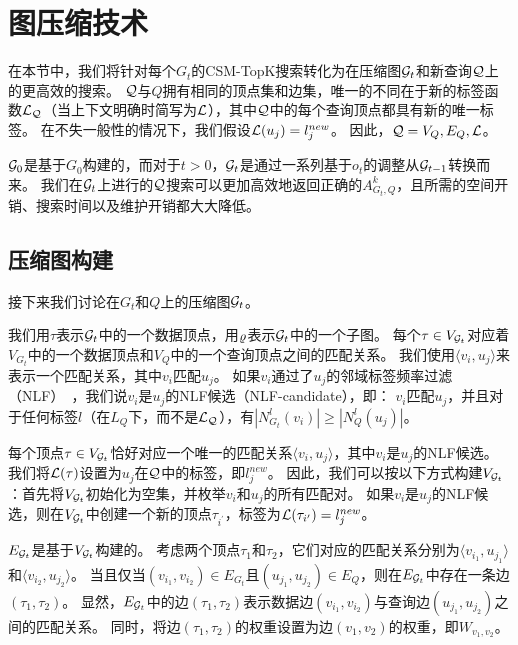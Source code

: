 \section{图压缩技术}
\label{mwstar:compact-graph}

在本节中，我们将针对每个$G_t$的CSM-TopK搜索转化为在压缩图$\mathcal{G}_t$和新查询$\mathcal{Q}$上的更高效的搜索。
$\mathcal{Q}$与$Q$拥有相同的顶点集和边集，唯一的不同在于新的标签函数$\mathcal{L}_{\mathcal{Q}}$（当上下文明确时简写为$\mathcal{L}$），其中$\mathcal{Q}$中的每个查询顶点都具有新的唯一标签。
在不失一般性的情况下，我们假设$\mathcal{L}(u_j) = l_j^{new}$。
因此，$\mathcal{Q} = {V_Q, E_Q, \mathcal{L}}$。

$\mathcal{G}_0$是基于$G_0$构建的，而对于$t>0$，$\mathcal{G}_t$是通过一系列基于$o_t$的调整从$\mathcal{G}_{t-1}$转换而来。
我们在$\mathcal{G}_t$上进行的$\mathcal{Q}$搜索可以更加高效地返回正确的$A_{G_t, Q}^k$，且所需的空间开销、搜索时间以及维护开销都大大降低。

\subsection{压缩图构建}
\label{s-sec:compact-graph-construction}

接下来我们讨论在$G_t$和$Q$上的压缩图$\mathcal{G}_t$。

我们用$\tau$表示$\mathcal{G}_t$中的一个数据顶点，用$\varrho$表示$\mathcal{G}_t$中的一个子图。
每个$\tau \in V_{\mathcal{G}_t}$对应着$V_{G_t}$中的一个数据顶点和$V_Q$中的一个查询顶点之间的匹配关系。
我们使用$\langle v_i, u_j \rangle$来表示一个匹配关系，其中$v_i$匹配$u_j$。
如果$v_i$通过了$u_j$的邻域标签频率过滤（NLF）~\cite{sgi-turbo-iso-DBLP:conf/sigmod/HanLL13}，我们说$v_i$是$u_j$的NLF候选（NLF-candidate），即：
$v_i$匹配$u_j$，并且对于任何标签$l$（在$L_Q$下，而不是$\mathcal{L}_{\mathcal{Q}}$），有$|N_{G_t}^l(v_i)| \geq |N_Q^l(u_j)|$。

每个顶点$\tau \in V_{\mathcal{G}_t}$恰好对应一个唯一的匹配关系$\langle v_i, u_j \rangle$，其中$v_i$是$u_j$的NLF候选。
我们将$\mathcal{L}(\tau)$设置为$u_j$在$\mathcal{Q}$中的标签，即$l_j^{new}$。
因此，我们可以按以下方式构建$V_{\mathcal{G}_t}$：首先将$V_{\mathcal{G}_t}$初始化为空集，并枚举$v_i$和$u_j$的所有匹配对。
如果$v_i$是$u_j$的NLF候选，则在$V_{\mathcal{G}_t}$中创建一个新的顶点$\tau_{i^\prime}$，标签为$\mathcal{L}(\tau_{i^\prime}) = l_j^{new}$。

$E_{\mathcal{G}_t}$是基于$V_{\mathcal{G}_t}$构建的。
考虑两个顶点$\tau_1$和$\tau_2$，它们对应的匹配关系分别为$\langle v_{i_1}, u_{j_1} \rangle$和$\langle v_{i_2}, u_{j_2} \rangle$。
当且仅当$(v_{i_1}, v_{i_2}) \in E_{G_t}$且$(u_{j_1}, u_{j_2}) \in E_Q$，则在$E_{\mathcal{G}_t}$中存在一条边$(\tau_1, \tau_2)$。
显然，$E_{\mathcal{G}_t}$中的边$(\tau_1, \tau_2)$表示数据边$(v_{i_1}, v_{i_2})$与查询边$(u_{j_1}, u_{j_2})$之间的匹配关系。
同时，将边$(\tau_1, \tau_2)$的权重设置为边$(v_1, v_2)$的权重，即$W_{v_1, v_2}$。

